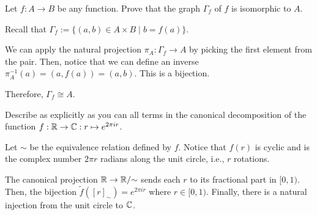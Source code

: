\documentclass[notes,tikz]{agony}
\begin{document}
\begin{xca}
  Let $f : A \to B$ be any function.
  Prove that the graph $\Gamma_f$ of $f$ is isomorphic to $A$.
\end{xca}
\begin{prf}
  Recall that $\Gamma_f := \{(a,b) \in A \times B \mid b = f(a)\}$.

  We can apply the natural projection $\pi_A : \Gamma_f \to A$
  by picking the first element from the pair.
  Then, notice that we can define an inverse $\pi_A^{-1}(a) = (a, f(a)) = (a, b)$.
  This is a bijection.

  Therefore, $\Gamma_f \cong A$.
\end{prf}

\begin{xca}
  Describe as explicitly as you can all terms in the canonical decomposition
  of the function $f : \mathbb{R} \to \mathbb{C} : r \mapsto e^{2\pi i r}$.
\end{xca}
\begin{sol}
  Let $\sim$ be the equivalence relation defined by $f$.
  Notice that $f(r)$ is cyclic and is the complex number $2\pi r$ radians along the unit circle,
  i.e., $r$ rotations.

  The canonical projection $\mathbb{R} \to \mathbb{R}/{\sim}$ sends each $r$
  to its fractional part in $[0,1)$.
  Then, the bijection $\tilde f([r]_\sim) = e^{2\pi i r}$ where $r \in [0,1)$.
  Finally, there is a natural injection from the unit circle to $\mathbb{C}$.
\end{sol}
\end{document}
